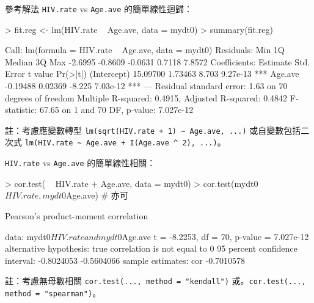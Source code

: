 \documentclass[14pt, aspectratio=43]{beamer}
\begin{document}
\begin{frame}{參考解法}
\verb+HIV.rate+ vs \verb+Age.ave+ 的簡單線性迴歸：
\begin{RC}
> fit.reg <- lm(HIV.rate ~ Age.ave, data = mydt0)
> summary(fit.reg)
\end{RC}
\begin{R}
Call:
lm(formula = HIV.rate ~ Age.ave, data = mydt0)
Residuals:
    Min      1Q  Median      3Q     Max 
-2.6995 -0.8609 -0.0631  0.7118  7.8572 
Coefficients:
            Estimate Std. Error t value Pr(>|t|)    
(Intercept) 15.09700    1.73463   8.703 9.27e-13 ***
Age.ave     -0.19488    0.02369  -8.225 7.03e-12 ***
---
Residual standard error: 1.63 on 70 degrees of freedom
Multiple R-squared:  0.4915,	Adjusted R-squared:  0.4842 
F-statistic: 67.65 on 1 and 70 DF,  p-value: 7.027e-12
\end{R}

\begin{minipage}{1\textwidth}
\tiny 註：考慮應變數轉型 \verb!lm(sqrt(HIV.rate + 1) ~ Age.ave, ...)! 或自變數包括二次式 \verb!lm(HIV.rate ~ Age.ave + I(Age.ave ^ 2), ...)!。
\end{minipage}

\framebreak

\verb+HIV.rate+ vs \verb+Age.ave+ 的簡單線性相關：
\begin{RC}
> cor.test( ~ HIV.rate + Age.ave, data = mydt0)
> cor.test(mydt0$HIV.rate, mydt0$Age.ave)  # 亦可
\end{RC}
\begin{R}
	Pearson's product-moment correlation

data:  mydt0$HIV.rate and mydt0$Age.ave
t = -8.2253, df = 70, p-value = 7.027e-12
alternative hypothesis: true correlation is not equal to 0
95 percent confidence interval:
 -0.8024053 -0.5604066
sample estimates:
       cor 
-0.7010578 
\end{R}

\begin{minipage}{1\textwidth}
\tiny 註：考慮無母數相關 \verb!cor.test(..., method = "kendall")! 或。\verb!cor.test(..., method = "spearman")!。
\end{minipage}

\framebreak


\end{frame}
\end{document}
